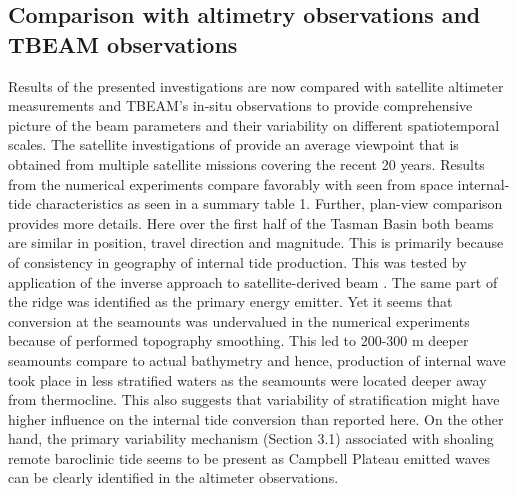 \documentclass[12pt]{article}
\begin{document}
\subsection{Comparison with altimetry observations and TBEAM observations}
Results of the presented investigations are now compared  with satellite altimeter measurements  
\citep{zhao2018satellite} and TBEAM's in-situ observations \citep{waterhouse2018observations} to 
provide comprehensive picture of the beam parameters and their variability on different 
spatiotemporal scales. The satellite investigations of \citep{zhao2018satellite} provide an average 
viewpoint that is obtained from multiple satellite missions covering the recent 20 years. Results 
from the numerical experiments compare favorably with seen from space internal-tide characteristics 
as seen in a summary table 1. Further, plan-view comparison  provides 
more details. Here over the first half of the Tasman Basin both beams are similar in position, 
travel direction and magnitude. This is primarily because of consistency in geography of internal 
tide production. This was tested by application of the inverse approach to satellite-derived beam 
. The same part of 
the ridge was identified as the primary energy emitter. Yet it seems that conversion at the 
seamounts was undervalued in the numerical experiments because of performed topography smoothing. 
This led to 200-300 m deeper seamounts compare to actual bathymetry and hence, production of  
internal wave took place in less stratified waters as the seamounts were located deeper away from 
thermocline. This also suggests that variability of stratification might have higher influence on 
the internal tide conversion than reported here. On the other hand, the primary variability 
mechanism (Section 3.1) associated with shoaling remote baroclinic tide seems to be present as 
Campbell Plateau emitted waves can be clearly identified in the altimeter observations.\\
\end{document}
